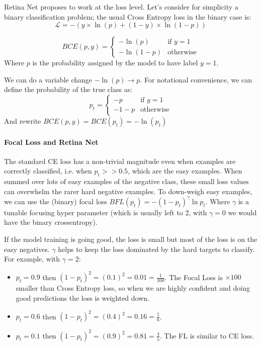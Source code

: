 Retina Net proposes to work at the loss level.
Let's consider for simplicity a binary classification problem; the usual Cross Entropy loss in the binary case is:
$$\mathcal{L} = -(y \times \ln(p) + (1-y) \times \ln(1-p))$$

$$BCE(p, y) = \left\{ \begin{array}{rcl}
  - \ln(p) & \mbox{if } y = 1 \\
  - \ln(1-p) & \mbox{otherwise}
\end{array}\right.$$
Where $p$ is the probability assigned by the model to have label $y=1$.

We can do a variable change $-\ln(p) \rightarrow p$.
For notational convenience, we can define the probability of the true class as:
$$p_t = \left\{ \begin{array}{rcl}
  - p & \mbox{if } y = 1 \\
  - 1-p & \mbox{otherwise}
\end{array}\right.$$
And rewrite $BCE(p,y) = BCE(p_t) = -\ln(p_t)$

\paragraph{Focal Loss and Retina Net}
The standard CE loss has a non-trivial magnitude even when examples are correctly classified, i.e. when $p_t >> 0.5$, which are the easy examples.
When summed over lots of easy examples of the negative class, these small loss values can overwhelm the rarer hard negative examples.
To down-weigh easy examples, we can use the (binary) focal loss $BFL(p_t) = -(1-p_t)^\gamma \ln p_t$.
Where $\gamma$ is a tunable focusing hyper parameter (which is usually left to 2, with $\gamma = 0$ we would have the binary crossentropy).

If the model training is going good, the loss is small but most of the loss is on the easy negatives.
$\gamma$ helps to keep the loss dominated by the hard targets to classify.
For example, with $\gamma = 2$:
\begin{itemize}
  \item $p_t = 0.9$ then $(1-p_t)^2 = (0.1)^2 = 0.01 = \frac{1}{100}$. The Focal Loss is $\times 100$ smaller than Cross Entropy loss, so when we are highly confident and doing good predictions the loss is weighted down.
  \item $p_t = 0.6$ then $(1-p_t)^2 = (0.4)^2 = 0.16 = \frac{1}{6}$.
  \item $p_t = 0.1$ then $(1-p_t)^2 = (0.9)^2 = 0.81 = \frac{4}{5}$. The FL is similar to CE loss.
\end{itemize}

